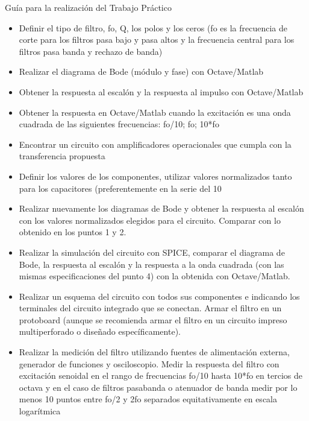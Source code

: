 Guía para la realización del Trabajo Práctico

\begin{itemize}
\item Definir el tipo de filtro, fo, Q, los polos y los ceros (fo es la frecuencia de corte para los filtros pasa bajo y pasa altos y la frecuencia central para los filtros pasa banda y rechazo de banda)
\item Realizar el diagrama de Bode (módulo y fase) con Octave/Matlab
\item Obtener la respuesta al escalón y la respuesta al impulso con Octave/Matlab
\item Obtener la respuesta en Octave/Matlab cuando la excitación es una onda cuadrada de las siguientes frecuencias: fo/10; fo; 10*fo 
\item Encontrar un circuito con amplificadores operacionales que cumpla con la transferencia propuesta
\item Definir los valores de los componentes, utilizar valores normalizados  tanto para los capacitores (preferentemente en la serie del 10%
\item Realizar nuevamente los diagramas de Bode y obtener la respuesta al escalón con los valores normalizados elegidos para el circuito. Comparar con lo obtenido en los puntos 1 y 2.
\item Realizar la simulación del circuito con SPICE, comparar el diagrama de Bode, la respuesta al escalón y la respuesta a la onda cuadrada (con las mismas especificaciones del punto 4) con la obtenida con Octave/Matlab.
\item Realizar un esquema del circuito con todos sus componentes e indicando los terminales del circuito integrado que se conectan. Armar el filtro en un protoboard (aunque se recomienda armar el filtro en un circuito impreso multiperforado o diseñado específicamente).
\item Realizar la medición del filtro utilizando fuentes de alimentación externa, generador de funciones y osciloscopio. 
	\subitem Medir la respuesta del filtro con excitación senoidal en el rango de frecuencias fo/10 hasta 10*fo en tercios de octava y en el caso de filtros pasabanda o atenuador de banda medir por lo menos 10 puntos entre fo/2 y 2fo separados equitativamente en escala logarítmica 

\end{itemize}
